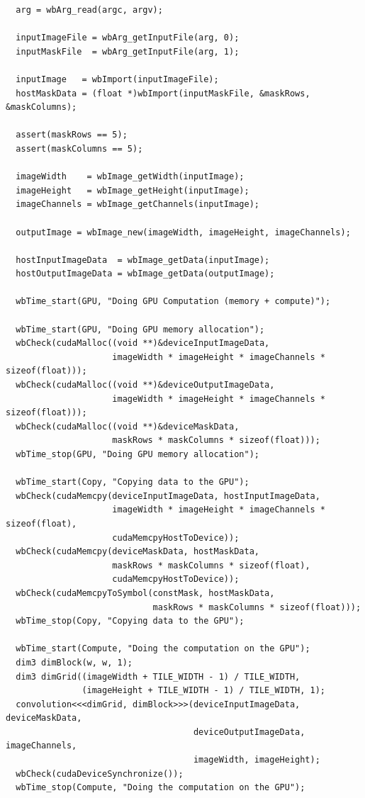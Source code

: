 \documentclass[14pt]{extarticle}
\newenvironment{code}{\captionsetup{type=listing, belowskip=-14pt plus 3pt minus 0pt}}{}
\begin{document}
\begin{code}
\begin{verbatim}
  arg = wbArg_read(argc, argv);

  inputImageFile = wbArg_getInputFile(arg, 0);
  inputMaskFile  = wbArg_getInputFile(arg, 1);

  inputImage   = wbImport(inputImageFile);
  hostMaskData = (float *)wbImport(inputMaskFile, &maskRows, &maskColumns);

  assert(maskRows == 5);
  assert(maskColumns == 5);

  imageWidth    = wbImage_getWidth(inputImage);
  imageHeight   = wbImage_getHeight(inputImage);
  imageChannels = wbImage_getChannels(inputImage);

  outputImage = wbImage_new(imageWidth, imageHeight, imageChannels);

  hostInputImageData  = wbImage_getData(inputImage);
  hostOutputImageData = wbImage_getData(outputImage);

  wbTime_start(GPU, "Doing GPU Computation (memory + compute)");

  wbTime_start(GPU, "Doing GPU memory allocation");
  wbCheck(cudaMalloc((void **)&deviceInputImageData,
                     imageWidth * imageHeight * imageChannels * sizeof(float)));
  wbCheck(cudaMalloc((void **)&deviceOutputImageData,
                     imageWidth * imageHeight * imageChannels * sizeof(float)));
  wbCheck(cudaMalloc((void **)&deviceMaskData,
                     maskRows * maskColumns * sizeof(float)));
  wbTime_stop(GPU, "Doing GPU memory allocation");

  wbTime_start(Copy, "Copying data to the GPU");
  wbCheck(cudaMemcpy(deviceInputImageData, hostInputImageData,
                     imageWidth * imageHeight * imageChannels * sizeof(float),
                     cudaMemcpyHostToDevice));
  wbCheck(cudaMemcpy(deviceMaskData, hostMaskData,
                     maskRows * maskColumns * sizeof(float),
                     cudaMemcpyHostToDevice));
  wbCheck(cudaMemcpyToSymbol(constMask, hostMaskData,
                             maskRows * maskColumns * sizeof(float)));
  wbTime_stop(Copy, "Copying data to the GPU");

  wbTime_start(Compute, "Doing the computation on the GPU");
  dim3 dimBlock(w, w, 1);
  dim3 dimGrid((imageWidth + TILE_WIDTH - 1) / TILE_WIDTH,
               (imageHeight + TILE_WIDTH - 1) / TILE_WIDTH, 1);
  convolution<<<dimGrid, dimBlock>>>(deviceInputImageData, deviceMaskData,
                                     deviceOutputImageData, imageChannels,
                                     imageWidth, imageHeight);
  wbCheck(cudaDeviceSynchronize());
  wbTime_stop(Compute, "Doing the computation on the GPU");


\end{verbatim}
\end{code}
\end{document}
